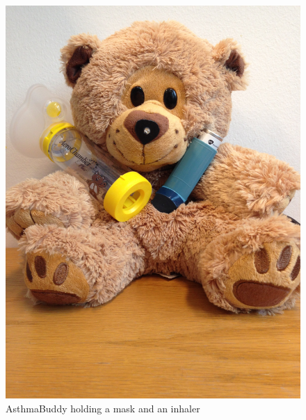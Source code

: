 \begin{figure}[H] 
	\begin{minipage}[t]{0.4\linewidth}
	\centering
		\includegraphics[width=0.3\paperwidth]{Pictures/abandinhaler.jpg}
	\caption[AsthmaBuddy holding a mask and an inhaler]{AsthmaBuddy holding a mask and an inhaler}
	\label{fig:asthmabuddyandinhaler}
	\end{minipage}
	\hspace{2.0cm}
	\begin{minipage}[t]{0.4\linewidth}
		\centering

\end{minipage}
\end{figure}

